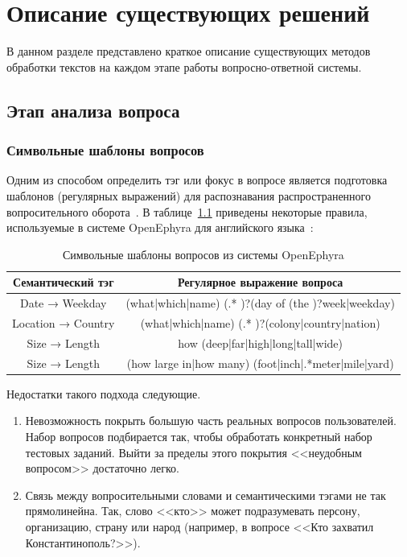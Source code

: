 \chapter{Описание существующих решений}

В данном разделе представлено краткое описание существующих методов обработки текстов на каждом этапе работы вопросно-ответной системы.

\section{Этап анализа вопроса}

\subsection{Символьные шаблоны вопросов}
Одним из способом определить тэг или фокус в вопросе является подготовка шаблонов (регулярных выражений) для распознавания распространенного вопросительного оборота~\cite{step1}. В таблице~\ref{tb:oe} приведены некоторые правила, используемые в системе OpenEphyra для английского языка~\cite{step11}:

\begin{table}[h!]
	\begin{center}
		\begin{threeparttable}
			\captionsetup{justification=raggedright,singlelinecheck=off}
			\caption{\label{tb:oe}Символьные шаблоны вопросов из системы OpenEphyra}
			\begin{tabular}{|c|c|}
				\hline
				\textbf{Семантический тэг} & \textbf{Регулярное выражение вопроса} \\ [0.8ex] 
				\hline
				Date → Weekday & (what|which|name) (.* )?(day of (the )?week|weekday)\\
				\hline
				Location → Country & (what|which|name) (.* )?(colony|country|nation)\\
				\hline
				Size → Length & how (deep|far|high|long|tall|wide)\\
				\hline
				Size → Length & (how large in|how many) (foot|inch|.*meter|mile|yard) \\
				\hline
			\end{tabular}
		\end{threeparttable} 
	\end{center}
\end{table}

Недостатки такого подхода следующие.
\begin{enumerate}
	\item Невозможность покрыть большую часть реальных вопросов
	пользователей. Набор вопросов подбирается так, чтобы обработать конкретный
	набор тестовых заданий. Выйти за пределы этого покрытия <<неудобным
	вопросом>> достаточно легко.
	\item Связь между вопросительными словами и семантическими тэгами не так прямолинейна.
	Так,
	слово <<кто>> может подразумевать персону, организацию, страну или народ (например, в вопросе <<Кто захватил Константинополь?>>).
\end{enumerate}

